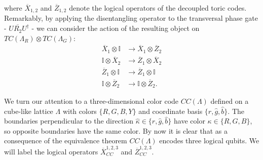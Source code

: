 \documentclass[12pt]{article}
\def\II{\mathbb{I}}
\theoremstyle{definition}
\begin{document}
where $\overline{X}_{1,2}$ and $\overline{Z}_{1,2}$ denote the logical operators of the decoupled toric codes. Remarkably, by applying the disentangling operator to the transversal phase gate - $U\overline{R_2}U^\dagger$ - we can consider the action of the resulting object on $TC(\Lambda_R)\otimes TC(\Lambda_G)$:
    \begin{align}
        \overline{X}_1\otimes\II&\rightarrow\overline{X}_1\otimes\overline{Z}_2\\
        \II\otimes\overline{X}_2&\rightarrow\overline{Z}_1\otimes\overline{X}_2\\
        \overline{Z}_1\otimes\II&\rightarrow\overline{Z}_1\otimes\II\\
        \II\otimes\overline{Z}_2&\rightarrow\II\otimes\overline{Z}_2.
    \end{align}

We turn our attention to a three-dimensional color code $CC(\Lambda)$ defined on a cube-like lattice $\Lambda$ with colors $\{R,G,B,Y\}$ and coordinate basis $\{\hat{r},\hat{g},\hat{b}\}$. The boundaries perpendicular to the direction $\hat{\kappa}\in\{\hat{r},\hat{g},\hat{b}\}$ have color $\kappa\in\{R,G,B\}$, so opposite boundaries have the same color. By now it is clear that as a consequence of the equivalence theorem $CC(\Lambda)$ encodes three logical qubits. We will label the logical operators $\overline{X}^{1,2,3}_{CC}$ and $\overline{Z}^{1,2,3}_{CC}$.\newline
\end{document}
